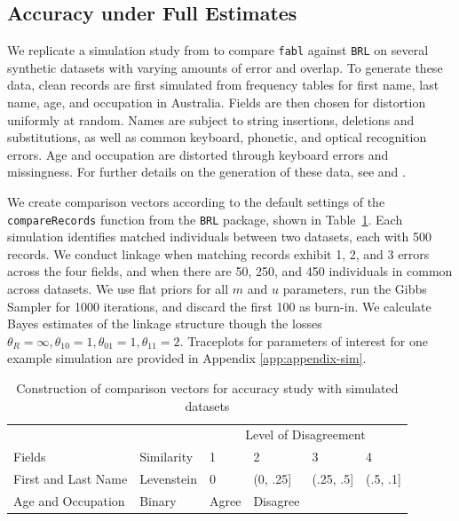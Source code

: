 \documentclass[ba]{imsart}
\begin{document}
\hypertarget{accuracy}{%
	\subsection{Accuracy under Full Estimates}\label{accuracy}}

We replicate a simulation study from \cite{sadinle_bayesian_2017} to compare \texttt{fabl} against \texttt{BRL} on several synthetic datasets with varying amounts of error and overlap. To generate these data, clean records are first simulated from frequency tables for first name, last name, age, and occupation in Australia. Fields are then chosen for distortion uniformly at random. Names are subject to string insertions, deletions and substitutions, as well as common keyboard, phonetic, and optical recognition errors. Age and occupation are distorted through keyboard errors and missingness. For further details on the generation of these data, see \cite{christen_pudjijono2009} and \cite{christen_vatsalan2013}.

We create comparison vectors according to the default settings of the \texttt{compareRecords} function from the \texttt{BRL} package, shown in Table~\ref{Tab:sadinle_simulation_cutoffs}. Each simulation identifies matched individuals between two datasets, each with 500 records. We conduct linkage when matching records exhibit 1, 2, and 3 errors across the four fields, and when there are 50, 250, and 450 individuals in common across datasets. We use flat priors for all $m$ and $u$ parameters, run the Gibbs Sampler for 1000 iterations, and discard the first 100 as burn-in. We calculate Bayes estimates of the linkage structure though the losses $\theta_R = \infty, \theta_{10} = 1, \theta_{01} = 1, \theta_{11} = 2$. Traceplots for parameters of interest for one example simulation are provided in Appendix \ref{app:appendix-sim}.

\begin{table}[t]
	\centering
	\begin{tabular}[t]{llllll}

		\multicolumn{2}{c}{ } & \multicolumn{4}{c}{Level of Disagreement} \\
		\cline{3-6}
		Fields & Similarity & 1 & 2 & 3 & 4\\
		\hline
		First and Last Name & Levenstein & 0 & (0, .25] & (.25, .5] & (.5, .1]\\
		Age and Occupation & Binary & Agree & Disagree &  & \\
		\hline
	\end{tabular}
\caption{Construction of comparison vectors for accuracy study with simulated datasets}
\label{Tab:sadinle_simulation_cutoffs}
\end{table}
	
\end{document}
